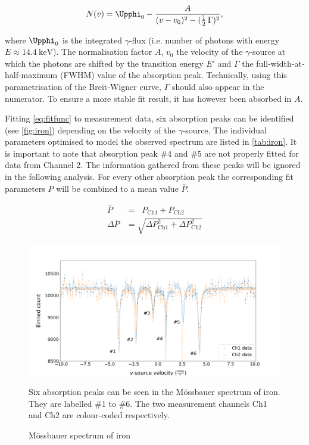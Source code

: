 \begin{equation}
\label{eq:fitfunc}
N(v) = \Upphi_0 - \frac{A}{(v-v_0)^2 - (\frac{1}{2}\,\Gamma)^2},
\end{equation}

where $\Upphi_0$ is the integrated $\gamma$-flux (i.e. number of photons with energy
$E\approx\SI{14.4}{\kilo\electronvolt}$). The normalisation factor $A$, $v_0$ the
velocity of the $\gamma$-source at which the photons are shifted by the transition
energy $E'$ and $\Gamma$ the full-width-at-half-maximum (FWHM) value of the
absorption peak. Technically, using this parametrisation of the Breit-Wigner curve,
$\Gamma$ should also appear in the numerator. To ensure a more stable fit result,
it has however been absorbed in $A$.

Fitting \autoref{eq:fitfunc} to measurement data, six absorption peaks can be
identified (see \autoref{fig:iron}) depending on the velocity of the $\gamma$-source.
The individual parameters optimised to model the observed spectrum are listed in
\autoref{tab:iron}. It is important to note that absorption peak \#4 and \#5 are not
properly fitted for data from Channel 2. The information gathered from these peaks
will be ignored in the following analysis. For every other absorption peak the
corresponding fit parameters $P$ will be combined to a mean value $\bar{P}$.



\begin{align*}
	\bar{P} &= \;\;P_\text{Ch1} + P_\text{Ch2} \\[0.5cm]
	\Delta\bar{P} &= \sqrt{\Delta P_\text{Ch1}^2 + \Delta P_\text{Ch2}^2  }
\end{align*}

\begin{figure}
	\includegraphics[width=1.0\textwidth]{./fig/Iron.png}
	\caption{Mössbauer spectrum of iron}{Six absorption peaks can be seen in the
	Mössbauer spectrum of iron. They are labelled \#1 to \#6. The two measurement
	channels Ch1 and Ch2 are colour-coded respectively.}\label{fig:iron}
\end{figure}

